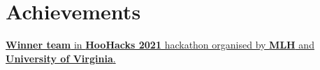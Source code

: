 \documentclass[]{deedy-resume-openfont}
\begin{document}
\begin{minipage}[t]{0.67\textwidth}

\section{Achievements} 
\href{https://devpost.com/software/finlearn}{{\textbf{Winner team}} in \textbf{HooHacks 2021} hackathon organised by \textbf{MLH} and \textbf{University of Virginia}.}

\end{minipage} 
\end{document}
